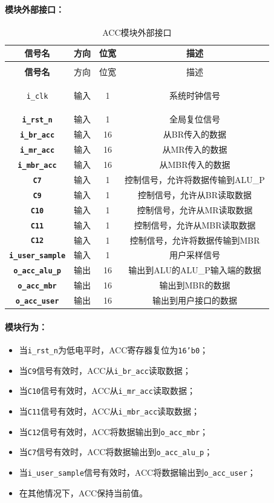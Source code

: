 \documentclass[lang=cn,a4paper,newtx]{elegantpaper}
\begin{document}
\paragraph{模块外部接口：}
\begin{longtable}{>{\bfseries}c c c c}
  \caption{ACC模块外部接口} \\ 
  \toprule
  信号名 & 方向 & 位宽 & 描述 \\ 
  \midrule
  \endfirsthead

  \multicolumn{4}{l}{\textbf{（续表）ACC模块外部接口}} \\ 
  \toprule
  信号名 & 方向 & 位宽 & 描述 \\ 
  \midrule
  \endhead

  \texttt{i\_clk} & 输入 & 1 & 系统时钟信号 \\ 
  \texttt{i\_rst\_n} & 输入 & 1 & 全局复位信号 \\ 
  \texttt{i\_br\_acc} & 输入 & 16 & 从BR传入的数据 \\ 
  \texttt{i\_mr\_acc} & 输入 & 16 & 从MR传入的数据 \\ 
  \texttt{i\_mbr\_acc} & 输入 & 16 & 从MBR传入的数据 \\ 
  \texttt{C7} & 输入 & 1 & 控制信号，允许将数据传输到ALU\_P \\ 
  \texttt{C9} & 输入 & 1 & 控制信号，允许从BR读取数据 \\ 
  \texttt{C10} & 输入 & 1 & 控制信号，允许从MR读取数据 \\ 
  \texttt{C11} & 输入 & 1 & 控制信号，允许从MBR读取数据 \\ 
  \texttt{C12} & 输入 & 1 & 控制信号，允许将数据传输到MBR \\ 
  \texttt{i\_user\_sample} & 输入 & 1 & 用户采样信号 \\ 
  \texttt{o\_acc\_alu\_p} & 输出 & 16 & 输出到ALU的ALU\_P输入端的数据 \\ 
  \texttt{o\_acc\_mbr} & 输出 & 16 & 输出到MBR的数据 \\ 
  \texttt{o\_acc\_user} & 输出 & 16 & 输出到用户接口的数据 \\ 
  \bottomrule
\end{longtable}

\paragraph{模块行为：}
\begin{itemize}
  \item 当\texttt{i\_rst\_n}为低电平时，ACC寄存器复位为\texttt{16'b0}；
  \item 当\texttt{C9}信号有效时，ACC从\texttt{i\_br\_acc}读取数据；
  \item 当\texttt{C10}信号有效时，ACC从\texttt{i\_mr\_acc}读取数据；
  \item 当\texttt{C11}信号有效时，ACC从\texttt{i\_mbr\_acc}读取数据；
  \item 当\texttt{C12}信号有效时，ACC将数据输出到\texttt{o\_acc\_mbr}；
  \item 当\texttt{C7}信号有效时，ACC将数据输出到\texttt{o\_acc\_alu\_p}；
  \item 当\texttt{i\_user\_sample}信号有效时，ACC将数据输出到\texttt{o\_acc\_user}；
  \item 在其他情况下，ACC保持当前值。
\end{itemize}
\end{document}
